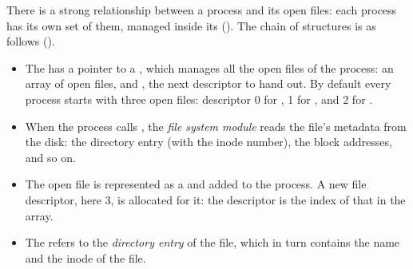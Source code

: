 There is a strong relationship between a process and its open files: each process has its own set of them, managed inside its \ts{} (). The chain of structures is as follows ().
\begin{itemize}
  \item The \ts{} has a pointer  to a , which manages all the open files of the process: an array  of open files, and , the next descriptor to hand out. By default every process starts with three open files: descriptor 0 for , 1 for , and 2 for .
  \item When the process calls , the \emph{file system module} reads the file's metadata from the disk: the directory entry (with the inode number), the block addresses, and so on.
  \item The open file is represented as a  and added to the process. A new file descriptor, here 3, is allocated for it: the descriptor is the index of that  in the  array.
  \item The  refers to the \emph{directory entry} of the file, which in turn contains the name and the inode of the file.
\end{itemize}

